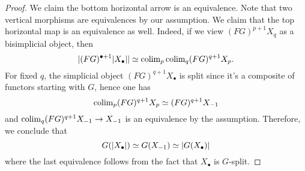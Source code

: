\begin{proof}
	We claim the bottom horizontal arrow is an equivalence.
	Note that two vertical morphisms are equivalences by our assumption. We claim that the top horizontal map is an equivalence as well. Indeed, if we view $(FG)^{p+1} X_{q}$ as a bisimplicial object, then 
	$$
	\lvert(FG)^{\bullet+1} \lvert X_{\bullet}\rvert\rvert 
	\simeq 
	\operatorname{colim}_{p} \operatorname{colim}_q (FG)^{q+1}X_{p} .
	$$
	For fixed $q$, the simplicial object $(FG)^{q+1}X_{\bullet}$ is split since it's a composite of functors starting with $G$, hence one has 
	$$
	\operatorname{colim}_{p}(FG)^{q+1}X_{p}\simeq (FG)^{q+1}X_{-1}
	$$
	and $\operatorname{colim}_{q} (FG)^{q+1} X_{-1} \to X_{-1}$  is an equivalence by the assumption.
	Therefore, we conclude that 
	$$
	G(\lvert X_{\bullet}\rvert) \simeq G(X_{-1}) \simeq \lvert G(X_{\bullet})\rvert
	$$
	where the last equivalence follows from the fact that $X_{\bullet}$ is $G$-split.
\end{proof}

